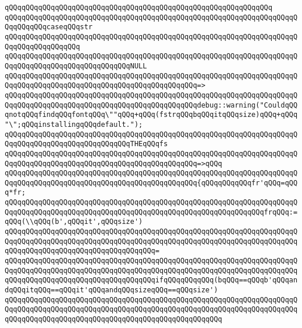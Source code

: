 \verb|qQQqqQQqqQQqqQQqqQQqqQQqqQQqqQQqqQQqqQQqqQQqqQQqqQQqqQQqqQQqqQQq|\newline
\verb|qQQqqQQqqQQqqQQqqQQqqQQqqQQqqQQqqQQqqQQqqQQqqQQqqQQqqQQqqQQqqQQqqQQqqQQqqQQqqQQqcaseqQQqstr|\newline
\verb|qQQqqQQqqQQqqQQqqQQqqQQqqQQqqQQqqQQqqQQqqQQqqQQqqQQqqQQqqQQqqQQqqQQqqQQqqQQqqQQqqQQqqQQq|\newline
\verb|qQQqqQQqqQQqqQQqqQQqqQQqqQQqqQQqqQQqqQQqqQQqqQQqqQQqqQQqqQQqqQQqqQQqqQQqqQQqqQQqqQQqqQQqqQQqqQQqqQQqNULL|\newline
\verb|qQQqqQQqqQQqqQQqqQQqqQQqqQQqqQQqqQQqqQQqqQQqqQQqqQQqqQQqqQQqqQQqqQQqqQQqqQQqqQQqqQQqqQQqqQQqqQQqqQQqqQQqqQQqqQQqqQQq=>|\newline
\verb|qQQqqQQqqQQqqQQqqQQqqQQqqQQqqQQqqQQqqQQqqQQqqQQqqQQqqQQqqQQqqQQqqQQqqQQqqQQqqQQqqQQqqQQqqQQqqQQqqQQqqQQqqQQqqQQqqQQqdebug::warning("CouldqQQqnotqQQqfindqQQqfontqQQq\""qQQq+qQQq(fstrqQQqbqQQqitqQQqsize)qQQq+qQQq"\";qQQqinstallingqQQqdefault.");|\newline
\newline
\verb|qQQqqQQqqQQqqQQqqQQqqQQqqQQqqQQqqQQqqQQqqQQqqQQqqQQqqQQqqQQqqQQqqQQqqQQqqQQqqQQqqQQqqQQqqQQqqQQqqQQqTHEqQQqfs|\newline
\verb|qQQqqQQqqQQqqQQqqQQqqQQqqQQqqQQqqQQqqQQqqQQqqQQqqQQqqQQqqQQqqQQqqQQqqQQqqQQqqQQqqQQqqQQqqQQqqQQqqQQqqQQqqQQqqQQqqQQq=>qQQq|\newline
\verb|qQQqqQQqqQQqqQQqqQQqqQQqqQQqqQQqqQQqqQQqqQQqqQQqqQQqqQQqqQQqqQQqqQQqqQQqqQQqqQQqqQQqqQQqqQQqqQQqqQQqqQQqqQQqqQQqqQQq{qQQqqQQqqQQqfr'qQQq=qQQq*fr;|\newline
\newline
\verb|qQQqqQQqqQQqqQQqqQQqqQQqqQQqqQQqqQQqqQQqqQQqqQQqqQQqqQQqqQQqqQQqqQQqqQQqqQQqqQQqqQQqqQQqqQQqqQQqqQQqqQQqqQQqqQQqqQQqqQQqqQQqqQQqqQQqfrqQQq:=qQQq(\\qQQq(b',qQQqit',qQQqsize')|\newline
\verb|qQQqqQQqqQQqqQQqqQQqqQQqqQQqqQQqqQQqqQQqqQQqqQQqqQQqqQQqqQQqqQQqqQQqqQQqqQQqqQQqqQQqqQQqqQQqqQQqqQQqqQQqqQQqqQQqqQQqqQQqqQQqqQQqqQQqqQQqqQQqqQQqqQQqqQQqqQQqqQQqqQQqqQQqqQQqqQQq=|\newline
\verb|qQQqqQQqqQQqqQQqqQQqqQQqqQQqqQQqqQQqqQQqqQQqqQQqqQQqqQQqqQQqqQQqqQQqqQQqqQQqqQQqqQQqqQQqqQQqqQQqqQQqqQQqqQQqqQQqqQQqqQQqqQQqqQQqqQQqqQQqqQQqqQQqqQQqqQQqqQQqqQQqqQQqqQQqqQQqqQQqifqQQqqQQqqQQq(bqQQq==qQQqb'qQQqandqQQqitqQQq==qQQqit'qQQqandqQQqsizeqQQq==qQQqsize')|\newline
\verb|qQQqqQQqqQQqqQQqqQQqqQQqqQQqqQQqqQQqqQQqqQQqqQQqqQQqqQQqqQQqqQQqqQQqqQQqqQQqqQQqqQQqqQQqqQQqqQQqqQQqqQQqqQQqqQQqqQQqqQQqqQQqqQQqqQQqqQQqqQQqqQQqqQQqqQQqqQQqqQQqqQQqqQQqqQQqqQQqqQQqqQQqqQQqqQQq|\newline
